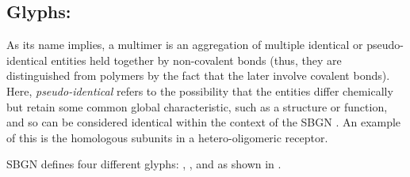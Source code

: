 \subsection{Glyphs: }
\label{sec:multimer}

As its name implies, a multimer is an aggregation of multiple identical or pseudo-identical entities held together by non-covalent bonds (thus, they are distinguished from polymers by the fact that the later involve covalent bonds).
Here,  \emph{pseudo-identical} refers to the possibility that the entities differ chemically but retain some common global characteristic, such as a structure or function, and so can be considered identical within the context of the SBGN \PD.
An example of this is the homologous subunits in a hetero-oligomeric receptor.

SBGN \PD defines four different  glyphs: , ,  and  as shown in .

